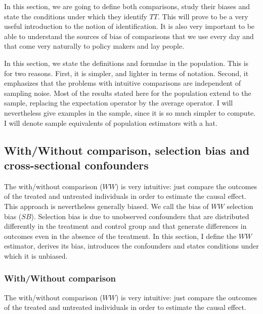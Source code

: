\documentclass[]{book}
\theoremstyle{definition}
\theoremstyle{definition}
\theoremstyle{definition}
\theoremstyle{remark}
\let\BeginKnitrBlock\begin \let\EndKnitrBlock\end
\begin{document}
In this section, we are going to define both comparisons, study their biases and state the conditions under which they identify \(TT\).
This will prove to be a very useful introduction to the notion of identification.
It is also very important to be able to understand the sources of bias of comparisons that we use every day and that come very naturally to policy makers and lay people.

\BeginKnitrBlock{remark}
\iffalse{} {Remark. } \fi{}In this section, we state the definitions and formulae in the population.
This is for two reasons.
First, it is simpler, and lighter in terms of notation.
Second, it emphasizes that the problems with intuitive comparisons are independent of sampling noise.
Most of the results stated here for the population extend to the sample, replacing the expectation operator by the average operator.
I will nevertheless give examples in the sample, since it is so much simpler to compute.
I will denote sample equivalents of population estimators with a hat.
\EndKnitrBlock{remark}

\hypertarget{withwithout-comparison-selection-bias-and-cross-sectional-confounders}{%
\subsection{With/Without comparison, selection bias and cross-sectional confounders}\label{withwithout-comparison-selection-bias-and-cross-sectional-confounders}}

The with/without comparison (\(WW\)) is very intuitive: just compare the outcomes of the treated and untreated individuals in order to estimate the causal effect.
This approach is nevertheless generally biased.
We call the bias of \(WW\) selection bias (\(SB\)).
Selection bias is due to unobserved confounders that are distributed differently in the treatment and control group and that generate differences in outcomes even in the absence of the treatment.
In this section, I define the \(WW\) estimator, derives its bias, introduces the confounders and states conditions under which it is unbiased.

\hypertarget{withwithout-comparison}{%
\subsubsection{With/Without comparison}\label{withwithout-comparison}}

The with/without comparison (\(WW\)) is very intuitive: just compare the outcomes of the treated and untreated individuals in order to estimate the causal effect.
\end{document}
